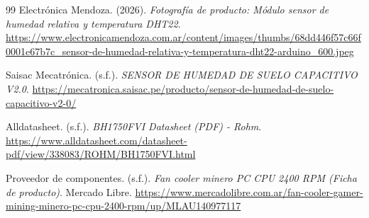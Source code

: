 \begin{thebibliography}{99}
Electrónica Mendoza. (2026). \textit{Fotografía de producto: Módulo sensor de humedad relativa y temperatura DHT22}. \url{https://www.electronicamendoza.com.ar/content/images/thumbs/68dd446f57c66f0001e67b7c_sensor-de-humedad-relativa-y-temperatura-dht22-arduino_600.jpeg}

Saisac Mecatrónica. (s.f.). \textit{SENSOR DE HUMEDAD DE SUELO CAPACITIVO V2.0}. \url{https://mecatronica.saisac.pe/producto/sensor-de-humedad-de-suelo-capacitivo-v2-0/}   

Alldatasheet. (s.f.). \textit{BH1750FVI Datasheet (PDF) - Rohm}. \url{https://www.alldatasheet.com/datasheet-pdf/view/338083/ROHM/BH1750FVI.html}

Proveedor de componentes. (s.f.). \textit{Fan cooler minero PC CPU 2400 RPM (Ficha de producto)}. Mercado Libre. \url{https://www.mercadolibre.com.ar/fan-cooler-gamer-mining-minero-pc-cpu-2400-rpm/up/MLAU140977117}

\end{thebibliography}
